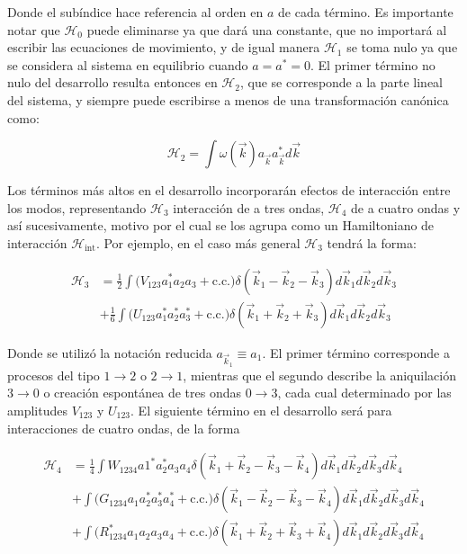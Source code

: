 Donde el subíndice hace referencia al orden en $a$ de cada término. Es importante notar que $\mathcal{H}_0$ puede eliminarse ya que dará una constante, que no importará al escribir las ecuaciones de movimiento, y de igual manera $\mathcal{H}_1$ se toma nulo ya que se considera al sistema en equilibrio cuando $a=a^*=0$. El primer término no nulo del desarrollo resulta entonces en $\mathcal{H}_2$, que se corresponde a la parte lineal del sistema, y siempre puede escribirse a menos de una transformación canónica como: 

\begin{equation}
	\mathcal{H}_2 = \int \omega(\vec k) a_{\vec k}a^*_{\vec k} d\vec k 
	\label{eq:quadratic_term} 
\end{equation} 

Los términos más altos en el desarrollo incorporarán efectos de interacción entre los modos, representando $\mathcal{H}_3$ interacción de a tres ondas, $\mathcal{H}_4$ de a cuatro ondas y así sucesivamente, motivo por el cual se los agrupa como un Hamiltoniano de interacción $\mathcal{H}_{\text{int}}$. Por ejemplo, en el caso más general $\mathcal{H}_3$ tendrá la forma: 

\begin{equation} 
	\begin{split}
		\mathcal{H}_3 &= \frac{1}{2}\int\big(V_{123}a^*_1a_2a_3+\text{c.c.}\big)\delta(\vec k_1-\vec k_2 -\vec k_3) d\vec k_1d\vec k_2d\vec k_3 \\ &+ \frac{1}{6} \int\big(U_{123}a^*_1a^*_2a^*_3+\text{c.c.}\big)\delta(\vec k_1 + \vec k_2 + \vec k_3) d\vec k_1d\vec k_2d\vec k_3
	\end{split}
\end{equation} 


Donde se utilizó la notación reducida $a_{\vec k_1}\equiv a_1$. El primer término corresponde a procesos del tipo $1\rightarrow2$ o $2\rightarrow1$, mientras que el segundo describe la aniquilación $3\rightarrow0$ o creación espontánea de tres ondas $0\rightarrow3$, cada cual determinado por las amplitudes $V_{123}$ y $U_{123}$. El siguiente término en el desarrollo será para interacciones de cuatro ondas, de la forma %

\begin{equation} 
	\begin{split}
		\mathcal{H}_4 &= \frac{1}{4} \int W_{1234}a1^*a_2^*a_3a_4\delta(\vec k_1+\vec k_2-\vec k_3-\vec k_4) d\vec k_1d\vec k_2d\vec k_3d\vec k_4 \\
		&+\int \big(G_{1234}a_1a_2^*a_3^*a_4^* + \text{c.c.}\big) \delta(\vec k_1-\vec k_2-\vec k_3-\vec k_4) d\vec k_1d\vec k_2d\vec k_3d\vec k_4 \\
		&+\int \big(R^*_{1234}a_1a_2a_3a_4 + \text{c.c.}\big) \delta(\vec k_1+\vec k_2+\vec k_3+\vec k_4) d\vec k_1d\vec k_2d\vec k_3d\vec k_4
	\end{split}	
\end{equation} 

